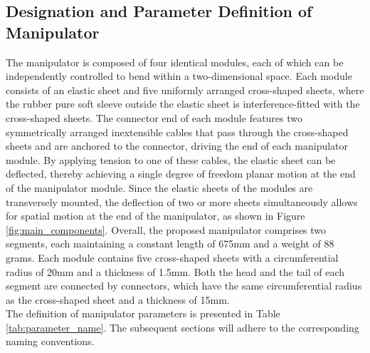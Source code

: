 \subsection{Designation and Parameter Definition of Manipulator} %
The manipulator is composed of four identical modules, each of which can be independently controlled to bend within a 
two-dimensional space. Each module consists of an elastic sheet and five uniformly arranged cross-shaped sheets, where 
the rubber pure soft sleeve outside the elastic sheet is interference-fitted with the cross-shaped sheets. The connector 
end of each module features two symmetrically arranged inextensible cables that pass through the cross-shaped sheets and 
are anchored to the connector, driving the end of each manipulator module. By applying tension to one of these cables, 
the elastic sheet can be deflected, thereby achieving a single degree of freedom planar motion at the end of the 
manipulator module. Since the elastic sheets of the modules are transversely mounted, the deflection of two or more 
sheets simultaneously allows for spatial motion at the end of the manipulator, as shown in Figure \ref{fig:main_components}. 
Overall, the proposed manipulator comprises two segments, each maintaining a constant length of 675mm and a weight of 
88 grams. Each module contains five cross-shaped sheets with a circumferential radius of 20mm and a thickness of 1.5mm. 
Both the head and the tail of each segment are connected by connectors, which have the same circumferential radius as 
the cross-shaped sheet and a thickness of 15mm. \\
The definition of manipulator parameters is presented in Table \ref{tab:parameter_name}. The subsequent sections 
will adhere to the corresponding naming conventions.
